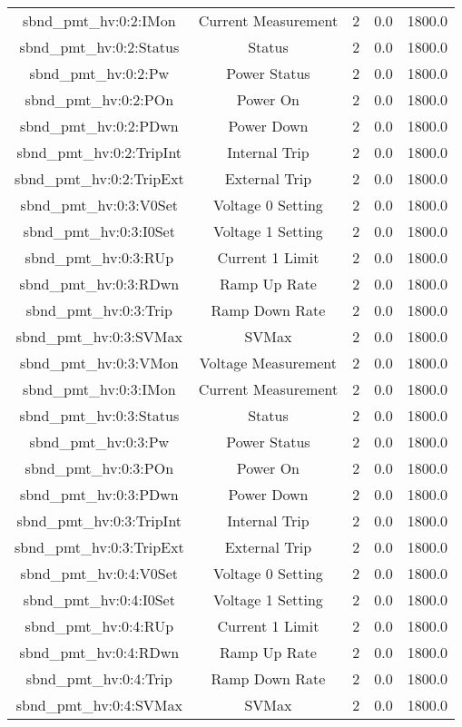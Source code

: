 \begin{table}[ptb]
\begin{tabular}{c | c c c c}
sbnd_pmt_hv:0:2:IMon & Current Measurement & 2 & 0.0 & 1800.0\\ 
sbnd_pmt_hv:0:2:Status & Status & 2 & 0.0 & 1800.0\\ 
sbnd_pmt_hv:0:2:Pw & Power Status & 2 & 0.0 & 1800.0\\ 
sbnd_pmt_hv:0:2:POn & Power On & 2 & 0.0 & 1800.0\\ 
sbnd_pmt_hv:0:2:PDwn & Power Down & 2 & 0.0 & 1800.0\\ 
sbnd_pmt_hv:0:2:TripInt & Internal Trip & 2 & 0.0 & 1800.0\\ 
sbnd_pmt_hv:0:2:TripExt & External Trip & 2 & 0.0 & 1800.0\\ 
sbnd_pmt_hv:0:3:V0Set & Voltage 0 Setting & 2 & 0.0 & 1800.0\\ 
sbnd_pmt_hv:0:3:I0Set & Voltage 1 Setting & 2 & 0.0 & 1800.0\\ 
sbnd_pmt_hv:0:3:RUp & Current 1 Limit & 2 & 0.0 & 1800.0\\ 
sbnd_pmt_hv:0:3:RDwn & Ramp Up Rate & 2 & 0.0 & 1800.0\\ 
sbnd_pmt_hv:0:3:Trip & Ramp Down Rate & 2 & 0.0 & 1800.0\\ 
sbnd_pmt_hv:0:3:SVMax & SVMax & 2 & 0.0 & 1800.0\\ 
sbnd_pmt_hv:0:3:VMon & Voltage Measurement & 2 & 0.0 & 1800.0\\ 
sbnd_pmt_hv:0:3:IMon & Current Measurement & 2 & 0.0 & 1800.0\\ 
sbnd_pmt_hv:0:3:Status & Status & 2 & 0.0 & 1800.0\\ 
sbnd_pmt_hv:0:3:Pw & Power Status & 2 & 0.0 & 1800.0\\ 
sbnd_pmt_hv:0:3:POn & Power On & 2 & 0.0 & 1800.0\\ 
sbnd_pmt_hv:0:3:PDwn & Power Down & 2 & 0.0 & 1800.0\\ 
sbnd_pmt_hv:0:3:TripInt & Internal Trip & 2 & 0.0 & 1800.0\\ 
sbnd_pmt_hv:0:3:TripExt & External Trip & 2 & 0.0 & 1800.0\\ 
sbnd_pmt_hv:0:4:V0Set & Voltage 0 Setting & 2 & 0.0 & 1800.0\\ 
sbnd_pmt_hv:0:4:I0Set & Voltage 1 Setting & 2 & 0.0 & 1800.0\\ 
sbnd_pmt_hv:0:4:RUp & Current 1 Limit & 2 & 0.0 & 1800.0\\ 
sbnd_pmt_hv:0:4:RDwn & Ramp Up Rate & 2 & 0.0 & 1800.0\\ 
sbnd_pmt_hv:0:4:Trip & Ramp Down Rate & 2 & 0.0 & 1800.0\\ 
sbnd_pmt_hv:0:4:SVMax & SVMax & 2 & 0.0 & 1800.0\\ 

\end{tabular}
\end{table}
